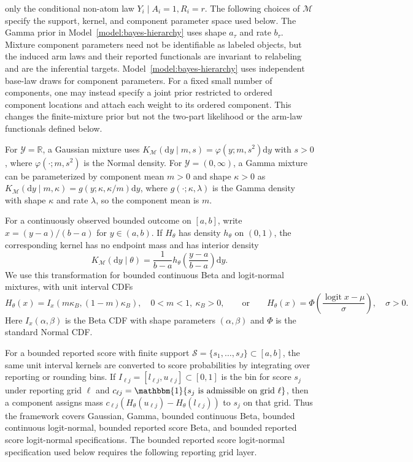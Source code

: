 \documentclass[11pt]{article}
\DeclareMathOperator{\logit}{logit}
\begin{document}
only the conditional non-atom law $Y_i\mid A_i=1,R_i=r$. The following choices
of $\mathcal{M}$ specify the support, kernel, and component parameter space used
below.
The Gamma prior in Model~\ref{model:bayes-hierarchy} uses shape $a_\tau$ and rate $b_\tau$. Mixture component parameters need not be identifiable as labeled objects, but the induced arm laws and their reported functionals are invariant to relabeling and are the inferential targets. Model~\ref{model:bayes-hierarchy} uses independent base-law draws for component parameters. For a fixed small number of components, one may instead specify a joint prior restricted to ordered component locations and attach each weight to its ordered component. This changes the finite-mixture prior but not the two-part likelihood or the arm-law functionals defined below.


For $\mathcal{Y}=\mathbb{R}$, a Gaussian mixture uses
$K_{\mathcal{M}}(\mathrm d y\mid m,s)=\varphi(y;m,s^2)\mathrm d y$ with $s > 0$, where
$\varphi(\cdot;m,s^2)$ is the Normal density. For $\mathcal{Y}=(0,\infty)$, a
Gamma mixture can be parameterized by component mean $m>0$ and shape
$\kappa>0$ as
$K_{\mathcal{M}}(\mathrm d y\mid m,\kappa)=g(y;\kappa,\kappa/m)\mathrm d y$, where
$g(\cdot;\kappa,\lambda)$ is the Gamma density with shape $\kappa$ and rate
$\lambda$, so the component mean is $m$.

For a continuously observed bounded outcome on $[a,b]$, write
$x=(y-a)/(b-a)$ for $y\in(a,b)$. If $H_\theta$ has density $h_\theta$ on $(0,1)$, the
corresponding kernel has no endpoint mass and has interior density
\[
  K_{\mathcal{M}}(\mathrm d y\mid\theta)
  =
  \frac{1}{b-a}h_\theta\!\left(\frac{y-a}{b-a}\right)\mathrm d y.
\]
We use this transformation for bounded continuous Beta and logit-normal
mixtures, with unit interval CDFs
\[
  H_\theta(x)=I_x(m\kappa_B,(1-m)\kappa_B),
  \quad 0<m<1,\ \kappa_B>0,
  \qquad\text{or}\qquad
  H_\theta(x)=\Phi\left(\frac{\logit x-\mu}{\sigma}\right),
  \quad \sigma>0.
\]
Here $I_x(\alpha,\beta)$ is the Beta CDF with shape parameters
$(\alpha,\beta)$ and $\Phi$ is the standard Normal CDF\@.

For a bounded reported score with finite support
$\mathcal{S}=\{s_1,\ldots,s_J\}\subset[a,b]$, the same unit interval kernels are
converted to score probabilities by integrating over reporting or rounding
bins. If $I_{\ell j}=[l_{\ell j},u_{\ell j}]\subset[0,1]$ is the bin for score
$s_j$ under reporting grid $\ell$ and
$c_{\ell j}=\mathbbm{1}\{s_j\text{ is admissible on grid }\ell\}$, then a
component assigns mass $c_{\ell j}(H_\theta(u_{\ell j})-H_\theta(l_{\ell j}))$
to $s_j$ on that grid. Thus the framework covers Gaussian,
Gamma, bounded continuous Beta, bounded continuous logit-normal, bounded
reported score Beta, and bounded reported score logit-normal specifications. The
bounded reported score logit-normal specification used below requires the following
reporting grid layer.
\end{document}
